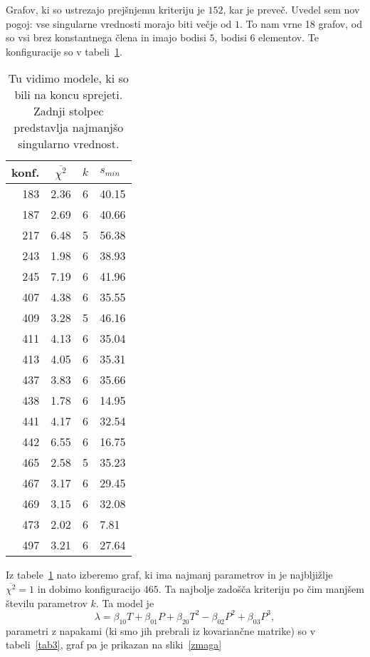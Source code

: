 \documentclass[a4 paper, 12pt]{article}
\begin{document}
Grafov, ki so ustrezajo prej\v snjemu kriteriju je $152$, kar je preve\v c. Uvedel sem nov pogoj: vse singularne
vrednosti morajo biti ve\v cje od $1$. To nam vrne 18 grafov, od so vsi brez konstantnega \v clena in imajo
bodisi $5$, bodisi $6$ elementov. Te konfiguracije so v tabeli~\ref{tab2}.
\begin{table}[H]\centering
	\caption{Tu vidimo modele, ki so bili na koncu sprejeti. Zadnji stolpec predstavlja najmanj\v so singularno
		vrednost.}
	\begin{tabular}{r|c|c|l}
		konf. & $\overline{\chi^2}$ & $k$ & $s_{min}$ \\
		\hline\hline
		183 & 2.36 & 6 & 40.15 \\
		187 & 2.69 & 6 & 40.66 \\
		217 & 6.48 & 5 & 56.38 \\
		243 & 1.98 & 6 & 38.93 \\
		245 & 7.19 & 6 & 41.96 \\
		407 & 4.38 & 6 & 35.55 \\
		409 & 3.28 & 5 & 46.16 \\
		411 & 4.13 & 6 & 35.04 \\
		413 & 4.05 & 6 & 35.31 \\
		437 & 3.83 & 6 & 35.66 \\
		438 & 1.78 & 6 & 14.95 \\
		441 & 4.17 & 6 & 32.54 \\
		442 & 6.55 & 6 & 16.75 \\
		465 & 2.58 & 5 & 35.23 \\
		467 & 3.17 & 6 & 29.45 \\
		469 & 3.15 & 6 & 32.08 \\
		473 & 2.02 & 6 & 7.81 \\
		497 & 3.21 & 6 & 27.64
	\end{tabular}
	\label{tab2}
\end{table}
Iz tabele~\ref{tab2} nato izberemo graf, ki ima najmanj parametrov in je najblji\v zlje $\overline{\chi^2} = 1$ in dobimo
konfiguracijo $465$. Ta najbolje zado\v s\v ca kriteriju po \v cim manj\v sem \v stevilu parametrov $k$. Ta model je
\begin{equation}
	\lambda = \beta_{10} T + \beta_{01} P + \beta_{20} T^2 - \beta_{02} P^2 + \beta_{03} P^3,
\end{equation}
parametri z napakami (ki smo jih prebrali iz kovarian\v cne matrike) so v tabeli~\ref{tab3}, graf pa je prikazan
na sliki~\ref{zmaga}
\end{document}
